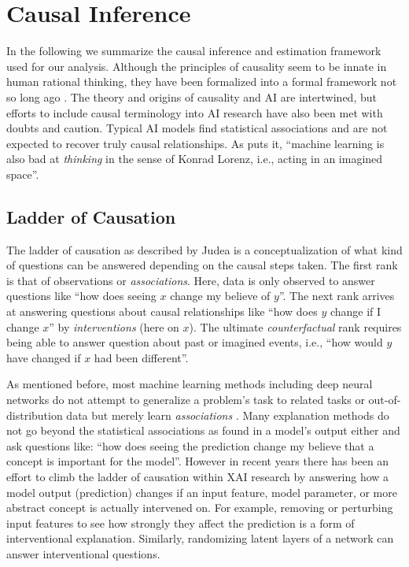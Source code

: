 \section{Causal Inference}\label{section:causal_inference_framework}
In the following we summarize the causal inference and estimation framework used for our analysis. 
Although the principles of causality seem to be innate in human rational thinking, they have been formalized into a formal framework not so long ago \citep{Spirtes1993, Halpern2005, Pearl2009, Peters2017}. The theory and origins of causality and AI are intertwined, but efforts to include causal terminology into AI research have also been met with doubts and caution. Typical AI models find statistical associations and are not expected to recover truly causal relationships. As \citet{Schoelkopf2019} puts it, ``machine learning is also bad at \textit{thinking} in the sense of Konrad Lorenz, i.e., acting in an imagined space''.

\subsection{Ladder of Causation}
The ladder of causation as described by Judea \citet{Pearl2009} is a conceptualization of what kind of questions can be answered depending on the causal steps taken.
The first rank is that of observations or \textit{associations}. Here, data is only observed to answer questions like ``how does seeing $x$ change my believe of $y$''.
The next rank arrives at answering questions about causal relationships like ``how does $y$ change if I change $x$'' by \textit{interventions} (here on $x$). The ultimate \textit{counterfactual} rank requires being able to answer question about past or imagined events, i.e., ``how would $y$ have changed if $x$ had been different''.

As mentioned before, most machine learning methods including deep neural networks do not attempt to generalize a problem's task to related tasks or out-of-distribution data but merely learn \textit{associations} \citep{Schoelkopf2019}. Many explanation methods do not go beyond the statistical associations as found in a model's output either and ask questions like: ``how does seeing the prediction change my believe that a concept is important for the model''. However in recent years there has been an effort to climb the ladder of causation within XAI research by answering how a model output (prediction) changes if an input feature, model parameter, or more abstract concept is actually intervened on. For example, removing or perturbing input features to see how strongly they affect the prediction is a form of interventional explanation. Similarly, randomizing latent layers of a network can answer interventional questions. 

